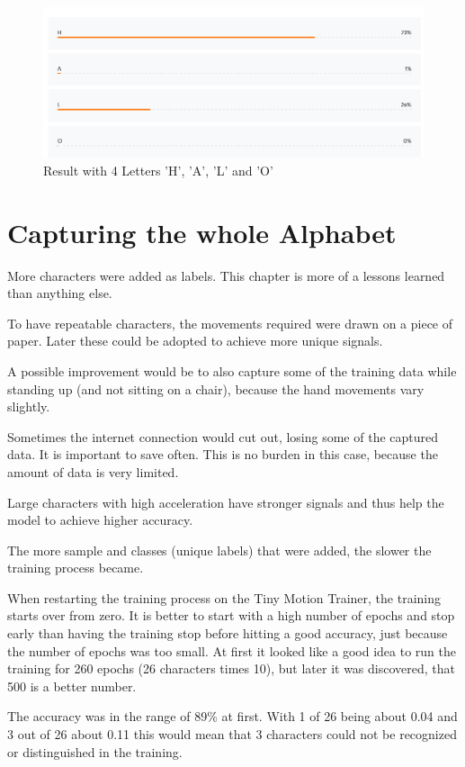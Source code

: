 \documentclass[a4paper,titlepage]{article}
\begin{document}
\begin{figure}[H]
    \includegraphics[width=\textwidth]{result_HALO.png}
    \caption{Result with 4 Letters 'H', 'A', 'L' and 'O'}
\end{figure}

\newpage
\section{Capturing the whole Alphabet}

More characters were added as labels.
This chapter is more of a lessons learned than anything else.

To have repeatable characters, the movements required were drawn on a piece of paper.
Later these could be adopted to achieve more unique signals.

A possible improvement would be to also capture some of the training data while standing up (and not sitting on a chair), because the hand movements vary slightly.

Sometimes the internet connection would cut out, losing some of the captured data.
It is important to save often.
This is no burden in this case, because the amount of data is very limited.

Large characters with high acceleration have stronger signals and thus help the model to achieve higher accuracy.

The more sample and classes (unique labels) that were added, the slower the training process became.

When restarting the training process on the Tiny Motion Trainer, the training starts over from zero.
It is better to start with a high number of epochs and stop early than having the training stop before hitting a good accuracy, just because the number of epochs was too small.
At first it looked like a good idea to run the training for 260 epochs (26 characters times 10), but later it was discovered, that 500 is a better number.

The accuracy was in the range of 89\% at first.
With 1 of 26 being about 0.04 and 3 out of 26 about 0.11 this would mean that 3 characters could not be recognized or distinguished in the training.
\end{document}
